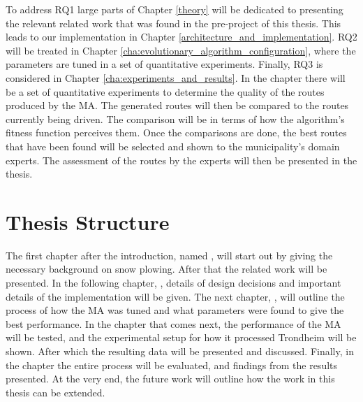 To address RQ1 large parts of Chapter \ref{theory} will be dedicated to presenting the relevant related work that was found in the pre-project of this thesis. This leads to our implementation in Chapter \ref{architecture_and_implementation}. RQ2 will be treated in Chapter \ref{cha:evolutionary_algorithm_configuration}, where the parameters are tuned in a set of quantitative experiments. Finally, RQ3 is considered in Chapter \ref{cha:experiments_and_results}. In the chapter there will be a set of quantitative experiments to determine the quality of the routes produced by the MA. The generated routes will then be compared to the routes currently being driven. The comparison will be in terms of how the algorithm's fitness function perceives them. Once the comparisons are done, the best routes that have been found will be selected and shown to the municipality's domain experts. The assessment of the routes by the experts will then be presented in the thesis.

\section{Thesis Structure}

The first chapter after the introduction, named , will start out by giving the necessary background on snow plowing. After that the related work will be presented. In the following chapter, , details of design decisions and important details of the implementation will be given. The next chapter, , will outline the process of how the MA was tuned and what parameters were found to give the best performance. In the  chapter that comes next, the performance of the MA will be tested, and the experimental setup for how it processed Trondheim will be shown. After which the resulting data will be presented and discussed. Finally, in the  chapter the entire process will be evaluated, and findings from the results presented. At the very end, the future work will outline how the work in this thesis can be extended.

\cleardoublepage
